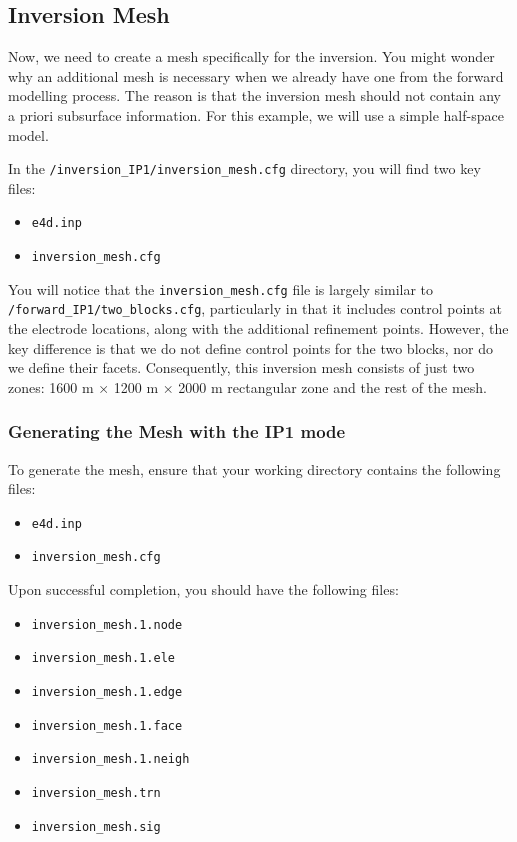 \documentclass[a4paper,12pt]{article}
\begin{document}
\subsection{Inversion Mesh}

Now, we need to create a mesh specifically for the inversion. You might wonder why an additional mesh is necessary when we already have one from the forward modelling process. The reason is that the inversion mesh should not contain any a priori subsurface information. For this example, we will use a simple half-space model.

In the \texttt{/inversion\_IP1/inversion\_mesh.cfg} directory, you will find two key files:

\begin{itemize}
    \item \texttt{e4d.inp}
    \item \texttt{inversion\_mesh.cfg}
\end{itemize}

You will notice that the \texttt{inversion\_mesh.cfg} file is largely similar to \newline \texttt{/forward\_IP1/two\_blocks.cfg}, particularly in that it includes control points at the electrode locations, along with the additional refinement points. However, the key difference is that we do not define control points for the two blocks, nor do we define their facets. Consequently, this inversion mesh consists of just two zones: 1600 m × 1200 m × 2000 m rectangular zone and the rest of the mesh.

\subsubsection{Generating the Mesh with the IP1 mode}

To generate the mesh, ensure that your working directory contains the following files:

\begin{itemize}
    \item \texttt{e4d.inp}
    \item \texttt{inversion\_mesh.cfg}
\end{itemize}

Upon successful completion, you should have the following files:

\begin{itemize}
    \item \texttt{inversion\_mesh.1.node}
    \item \texttt{inversion\_mesh.1.ele}
    \item \texttt{inversion\_mesh.1.edge}
    \item \texttt{inversion\_mesh.1.face}
    \item \texttt{inversion\_mesh.1.neigh}
    \item \texttt{inversion\_mesh.trn}
    \item \texttt{inversion\_mesh.sig}
\end{itemize}
\end{document}
